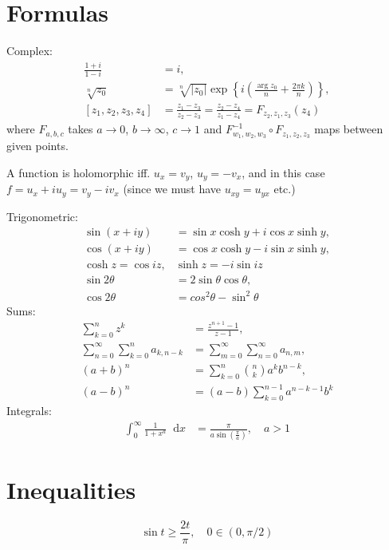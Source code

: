 \documentclass[10pt]{article}
\newcommand\dif{\mathop{}\!\mathrm{d}}
\begin{document}
\section{Formulas}
Complex:
\begin{align*}
   \frac{1 + i}
        {1 - i}
&= i, \\
   \sqrt[n]{z_0}
&= \sqrt[n]{|z_0|}
   \exp
   \left\{
     i
     \left(
       \frac{\arg z_0}{n}
     + \frac{2 \pi k}{n}
     \right)
   \right\}, \\
   [z_1, z_2, z_3, z_4]
&= \frac{z_1 - z_3}
        {z_2 - z_3}
 = \frac{z_2 - z_4}
        {z_1 - z_4}
 = F_{z_2, z_1, z_3}(z_4)
\end{align*}
where $F_{a,b,c}$ takes $a \to 0$, $b \to \infty$, $c \to 1$ and
$F_{w_1, w_2, w_3}^{-1} \circ F_{z_1, z_2, z_3}$ maps between given points.

A function is holomorphic iff. $u_x = v_y$, $u_y = -v_x$, and in this
case $f = u_x + i u_y = v_y - i v_x$ (since we must have $u_{xy} =
u_{yx}$ etc.)

Trigonometric:
\begin{align*}
   \sin (x + i y)
&= \sin x \cosh y
 + i \cos x \sinh y, \\
   \cos (x + i y)
&= \cos x \cosh y
 - i \sin x \sinh y, \\
  \cosh z = \cos iz,
& \sinh z = -i \sin iz \\
   \sin 2\theta
&= 2\sin \theta \cos \theta, \\
   \cos 2\theta
&= cos^2\theta - \sin^2\theta
\end{align*}
Sums:
\begin{align*}
   \sum_{k=0}^n
     z^k
&= \frac{z^{n+1} - 1}
        {z - 1}, \\
   \sum_{n=0}^\infty
     \sum_{k=0}^n
       a_{k,n-k}
&= \sum_{m=0}^\infty
     \sum_{n=0}^\infty
       a_{n,m}, \\
   (a + b)^n
&= \sum_{k=0}^n
     {n \choose k}
     a^k b^{n-k}, \\
   (a - b)^n
&= (a - b)
   \sum_{k=0}^{n-1}
     a^{n-k-1} b^k
\end{align*}
Integrals:
\begin{align*}
   \int_0^\infty
     \frac{1}{1 + x^a}
     \dif x
&= \frac{\pi}
        {a \sin \left(\frac{\pi}{a}\right)}, \quad a > 1
\end{align*}

\section{Inequalities}
$$
\sin t \geq \frac{2t}{\pi}, \quad 0 \in (0, \pi / 2)
$$
\end{document}
